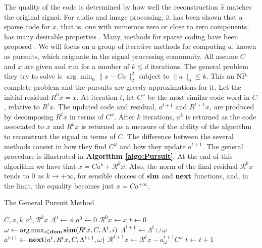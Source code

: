 \documentclass[runningheads,a4paper]{llncs}
\begin{document}
The quality of the code is determined by how well the reconstruction $\hat{x}$ matches the original signal. For audio and image processing, it has been shown that a sparse code for $x$, that is, one with numerous zero or close to zero components, has many desirable properties \cite{emergence-sparse-coding,sparse-coding-strategy-V1}. Many, methods for sparse coding have been proposed \cite{undetermined-minimal-L1,sparse-coding-strategy-V1}. We will focus on a group of iterative methods for computing $a$, known as pursuits, which originate in the signal processing community. All assume $C$ and $x$ are given and run for a number of $k \leq d$ iterations. The general problem they try to solve is $\arg\min_a \|x - Ca\|_2^2$ subject to $\|a\|_0 \leq k$. This an NP-complete problem and the pursuits are greedy approximations for it. Let the initial residual $R^0x = x$. At iteration $t$, let $C^\omega$ be the most similar code word in $C$, relative to $R^tx$. The updated code and residual, $a^{t+1}$ and $R^{t+1}x$, are produced by decomposing $R^tx$ in terms of $C^\omega$. After $k$ iterations, $a^k$ is returned as the code associated to $x$ and $R^kx$ is returned as a measure of the ability of the algorithm to reconstruct the signal in terms of $C$. The difference between the several methods consist in how they find $C^\omega$ and how they update $a^{t+1}$. The general procedure is illustrated in \textbf{Algorithm \ref{algo:Pursuit}}. At the end of this algorithm we have that $x = Ca^k + \mathcal{R}^kx$. Also, the norm of the final residual $\mathcal{R}^kx$ tends to $0$ as $k \rightarrow +\infty$, for sensible choices of $\text{\textbf{sim}}$ and $\text{\textbf{next}}$ functions, and, in the limit, the equality becomes just $x = Ca^{+\infty}$. 

\begin{algorithm}
\caption{The General Pursuit Method}
\label{algo:Pursuit}
\begin{algorithmic}
\Require $C,x,k$
\Ensure $a^k,\mathcal{R}^kx$
\State $\Lambda^0 \gets \phi$
\State $a^0 \gets 0$
\State $\mathcal{R}^0x \gets x$
\State $t \gets 0$
\State $\omega \gets \arg \max_{i \in \textbf{dom}} \text{\textbf{sim}}(R^tx,C,\Lambda^t,i)$
\State $\Lambda^{t+1} \gets \Lambda^t \cup \omega$
\State $a^{t+1} \gets \text{\textbf{next}}(a^t,R^tx,C,\Lambda^{t+1},\omega)$
\State $\mathcal{R}^{t+1}x \gets \mathcal{R}^tx - a^{t+1}_\omega C^\omega$
\State $t \gets t + 1$
\EndWhile
\end{algorithmic}
\end{algorithm}
\end{document}
